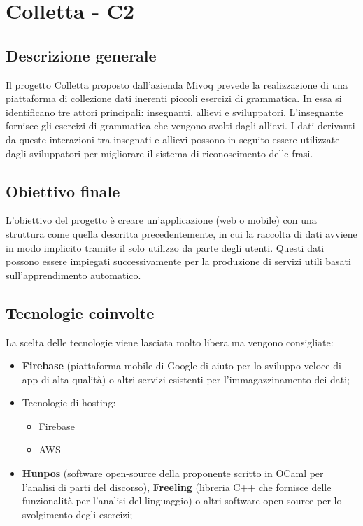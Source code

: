 \section{Colletta - C2} \label{c2}
    \subsection{Descrizione generale}
    Il progetto Colletta proposto dall'azienda Mivoq prevede la realizzazione di una piattaforma di collezione dati inerenti piccoli esercizi di grammatica. In essa si identificano tre attori principali: insegnanti, allievi e sviluppatori. L'insegnante fornisce gli esercizi di grammatica che vengono svolti dagli allievi. I dati derivanti da queste interazioni tra insegnati e allievi possono in seguito essere utilizzate dagli sviluppatori per migliorare il sistema di riconoscimento delle frasi.

    \subsection{Obiettivo finale}
    L'obiettivo del progetto è creare un'applicazione (web o mobile) con una struttura come quella descritta precedentemente, in cui la raccolta di dati avviene in modo implicito tramite il solo utilizzo da parte degli utenti. Questi dati possono essere impiegati successivamente per la produzione di servizi utili basati sull'apprendimento automatico.

    \subsection{Tecnologie coinvolte}
    La scelta delle tecnologie viene lasciata molto libera ma vengono consigliate:
    	\begin{itemize}
    		\item \textbf{Firebase} (piattaforma mobile di Google di aiuto per lo sviluppo veloce di app di alta qualità) o altri servizi esistenti per l'immagazzinamento dei dati;
    		\item Tecnologie di hosting:
    		\begin{itemize}
    			\item Firebase
    			\item AWS
    		\end{itemize}
    		\item \textbf{Hunpos} (software open-source della proponente scritto in OCaml per l'analisi di parti del discorso), \textbf{Freeling} (libreria C++ che fornisce delle funzionalità per l'analisi del linguaggio) o altri software open-source per lo svolgimento degli esercizi;
    	\end{itemize}

